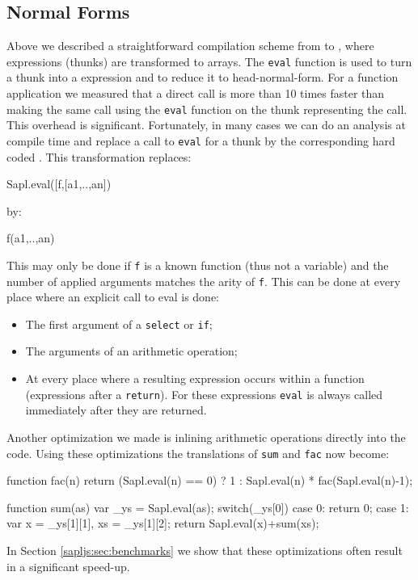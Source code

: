 \subsection{Normal Forms}
Above we described a straightforward compilation scheme from \Sapl to \JS, 
where expressions (thunks) are transformed to arrays.
The \texttt{eval} function is used to turn a thunk into a \JS expression and to reduce it to head-normal-form.
For a function application  we measured that a direct \JS call is more than 10 times faster 
than making the same call using the 
\texttt{eval} function on the thunk representing the call. This overhead is significant. 
Fortunately, in many cases we can do an analysis at compile time and replace a call to \texttt{eval} for a thunk by the corresponding hard coded \JS.
This transformation replaces:
\begin{CleanCode}
Sapl.eval([f,[a1,..,an])
\end{CleanCode}
by:
\begin{CleanCode}
f(a1,..,an)
\end{CleanCode}
This may only be done if \texttt{f} is a known function (thus not a variable) and the number of applied arguments matches the
arity of \texttt{f}.
This can be done at every place where an explicit call to \textsf{eval} is done:
\begin{itemize}
\item The first argument of a \texttt{select} or \texttt{if};
\item The arguments of an arithmetic operation;
\item At every place where a resulting expression occurs within a \JS function (expressions after a \texttt{return}).
For these expressions  \texttt{eval} is always called immediately after they are returned.
\end{itemize}
Another optimization we made is inlining arithmetic operations directly into the code.
Using these optimizations the translations of \texttt{sum} and \texttt{fac} now become:
\begin{CleanCode}
function fac(n){
	return (Sapl.eval(n) == 0) ? 1 : Sapl.eval(n) * fac(Sapl.eval(n)-1);
}

function sum(as){
	var _ys = Sapl.eval(as);
	switch(_ys[0]){
		case 0: return 0;
		case 1: var x = _ys[1][1], xs = _ys[1][2]; 
		        return Sapl.eval(x)+sum(xs);
	}
}
\end{CleanCode}
In Section \ref{sapljs:sec:benchmarks} we show that these optimizations often result in 
a significant speed-up.


